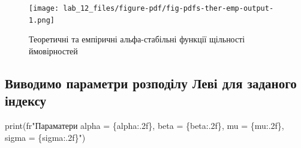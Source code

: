 \documentclass[
  letterpaper,
]{report}
\newenvironment{Shaded}{\begin{snugshade}}{\end{snugshade}}
\newcommand{\BuiltInTok}[1]{\textcolor[rgb]{0.00,0.23,0.31}{#1}}
\newcommand{\DecValTok}[1]{\textcolor[rgb]{0.68,0.00,0.00}{#1}}
\newcommand{\FloatTok}[1]{\textcolor[rgb]{0.68,0.00,0.00}{#1}}
\newcommand{\NormalTok}[1]{\textcolor[rgb]{0.00,0.23,0.31}{#1}}
\newcommand{\OperatorTok}[1]{\textcolor[rgb]{0.37,0.37,0.37}{#1}}
\newcommand{\SpecialCharTok}[1]{\textcolor[rgb]{0.37,0.37,0.37}{#1}}
\newcommand{\StringTok}[1]{\textcolor[rgb]{0.13,0.47,0.30}{#1}}
\newcommand{\VariableTok}[1]{\textcolor[rgb]{0.07,0.07,0.07}{#1}}
\newcommand{\VerbatimStringTok}[1]{\textcolor[rgb]{0.13,0.47,0.30}{#1}}
\begin{document}
\begin{Shaded}
\end{Shaded}

\begin{figure}[H]

{\centering \texttt{[image: lab\_12\_files/figure-pdf/fig-pdfs-ther-emp-output-1.png]}

}

\caption{\label{fig-pdfs-ther-emp}Теоретичні та емпіричні
альфа-стабільні функції щільності ймовірностей}

\end{figure}

\hypertarget{ux432ux438ux432ux43eux434ux438ux43cux43e-ux43fux430ux440ux430ux43cux435ux442ux440ux438-ux440ux43eux437ux43fux43eux434ux456ux43bux443-ux43bux435ux432ux456-ux434ux43bux44f-ux437ux430ux434ux430ux43dux43eux433ux43e-ux456ux43dux434ux435ux43aux441ux443}{%
\subsection{Виводимо параметри розподілу Леві для заданого
індексу}\label{ux432ux438ux432ux43eux434ux438ux43cux43e-ux43fux430ux440ux430ux43cux435ux442ux440ux438-ux440ux43eux437ux43fux43eux434ux456ux43bux443-ux43bux435ux432ux456-ux434ux43bux44f-ux437ux430ux434ux430ux43dux43eux433ux43e-ux456ux43dux434ux435ux43aux441ux443}}

\begin{Shaded}
\begin{Highlighting}[]
\BuiltInTok{print}\NormalTok{(}\VerbatimStringTok{fr"Параматери alpha = }\SpecialCharTok{\{}\NormalTok{alpha}\SpecialCharTok{:.2f\}}\VerbatimStringTok{, beta = }\SpecialCharTok{\{}\NormalTok{beta}\SpecialCharTok{:.2f\}}\VerbatimStringTok{, mu = }\SpecialCharTok{\{}\NormalTok{mu}\SpecialCharTok{:.2f\}}\VerbatimStringTok{, sigma = }\SpecialCharTok{\{}\NormalTok{sigma}\SpecialCharTok{:.2f\}}\VerbatimStringTok{"}\NormalTok{)}
\end{Highlighting}
\end{Shaded}
\end{document}
